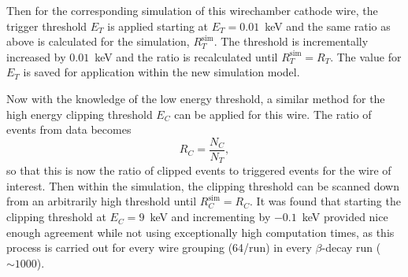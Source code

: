 Then for the corresponding simulation of this wirechamber cathode wire, the trigger threshold $E_T$
is applied starting at $E_T=0.01$~keV and the same ratio as above is calculated for the simulation,
$R^{\mathrm{sim}}_{T}$. The
threshold is incrementally increased by $0.01$~keV and the ratio is recalculated until
$R^{\mathrm{sim}}_{T} = R_T$. The value for $E_T$ is saved for application within the new simulation
model.

Now with the knowledge of the low energy threshold, a similar method for the high energy clipping
threshold $E_C$ can be applied for this wire. The ratio of events from data becomes
\begin{equation}
  R_{C} = \frac{N_C}{N_{T}},
\end{equation}
so that this is now the ratio of clipped events to triggered events for the wire of interest.
Then within the simulation, the clipping threshold can be scanned down from an arbitrarily high
threshold until $R^{\mathrm{sim}}_{C} = R_C$. It was found that starting 
the clipping threshold at $E_C=9$~keV and incrementing by $-0.1$~keV provided nice enough
agreement while not using exceptionally high computation times, as this process is carried out
for every wire grouping (64/run) in every $\beta$-decay run ($\sim1000$).

